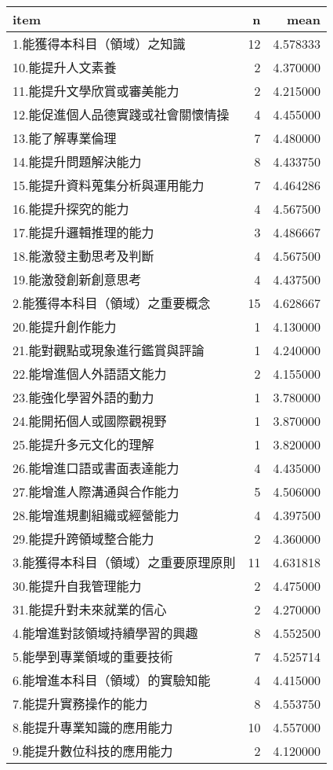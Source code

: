 \documentclass[
]{book}
\begin{document}
\begin{tabular}{l|r|r}
\hline
item & n & mean\\
\hline
1.能獲得本科目（領域）之知識 & 12 & 4.578333\\
\hline
10.能提升人文素養 & 2 & 4.370000\\
\hline
11.能提升文學欣賞或審美能力 & 2 & 4.215000\\
\hline
12.能促進個人品德實踐或社會關懷情操 & 4 & 4.455000\\
\hline
13.能了解專業倫理 & 7 & 4.480000\\
\hline
14.能提升問題解決能力 & 8 & 4.433750\\
\hline
15.能提升資料蒐集分析與運用能力 & 7 & 4.464286\\
\hline
16.能提升探究的能力 & 4 & 4.567500\\
\hline
17.能提升邏輯推理的能力 & 3 & 4.486667\\
\hline
18.能激發主動思考及判斷 & 4 & 4.567500\\
\hline
19.能激發創新創意思考 & 4 & 4.437500\\
\hline
2.能獲得本科目（領域）之重要概念 & 15 & 4.628667\\
\hline
20.能提升創作能力 & 1 & 4.130000\\
\hline
21.能對觀點或現象進行鑑賞與評論 & 1 & 4.240000\\
\hline
22.能增進個人外語語文能力 & 2 & 4.155000\\
\hline
23.能強化學習外語的動力 & 1 & 3.780000\\
\hline
24.能開拓個人或國際觀視野 & 1 & 3.870000\\
\hline
25.能提升多元文化的理解 & 1 & 3.820000\\
\hline
26.能增進口語或書面表達能力 & 4 & 4.435000\\
\hline
27.能增進人際溝通與合作能力 & 5 & 4.506000\\
\hline
28.能增進規劃組織或經營能力 & 4 & 4.397500\\
\hline
29.能提升跨領域整合能力 & 2 & 4.360000\\
\hline
3.能獲得本科目（領域）之重要原理原則 & 11 & 4.631818\\
\hline
30.能提升自我管理能力 & 2 & 4.475000\\
\hline
31.能提升對未來就業的信心 & 2 & 4.270000\\
\hline
4.能增進對該領域持續學習的興趣 & 8 & 4.552500\\
\hline
5.能學到專業領域的重要技術 & 7 & 4.525714\\
\hline
6.能增進本科目（領域）的實驗知能 & 4 & 4.415000\\
\hline
7.能提升實務操作的能力 & 8 & 4.553750\\
\hline
8.能提升專業知識的應用能力 & 10 & 4.557000\\
\hline
9.能提升數位科技的應用能力 & 2 & 4.120000\\
\hline
\end{tabular}
\end{document}
